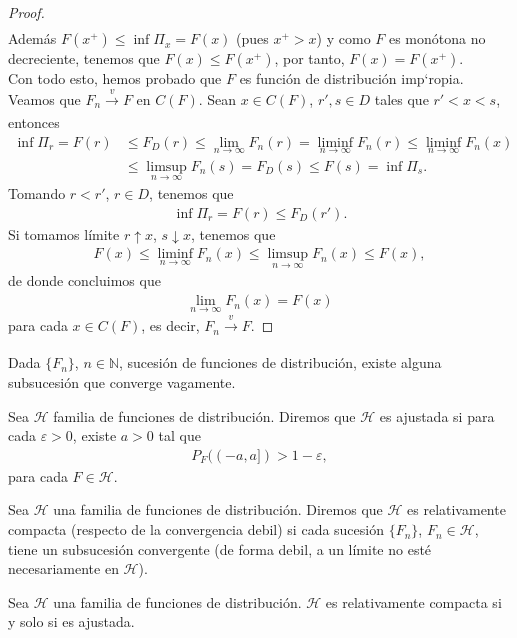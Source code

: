 \begin{proof}
\begin{align*}
    \end{align*}
    Además $F(x^+) \leq \inf \Pi_x = F(x)$ (pues $x^+ > x$) y como $F$ es monótona no decreciente, tenemos que $F(x) \leq F(x^+)$, por tanto, $F(x) = F(x^+)$.
    \\
    \newline
    Con todo esto, hemos probado que $F$ es función de distribución imp`ropia. Veamos que $F_n \xrightarrow[]{v} F$ en $C(F)$. Sean $x \in C(F)$, $r',s \in D$ tales que $r' < x < s$, entonces
    \begin{align*}
       \inf \Pi_r =  F(r) &\leq F_D(r) \leq \lim_{n \to \infty} F_n(r) = \liminf_{n \to \infty} F_n(r) \leq \liminf_{n \to \infty} F_n(x) \\ 
       &\leq \limsup_{n \to \infty} F_n(s) = F_D(s) \leq F(s) = \inf \Pi_s.
    \end{align*}
    Tomando $r < r'$, $r \in D$, tenemos que
    \begin{align*}
        \inf \Pi_r = F(r) \leq F_D(r').
    \end{align*}
    Si tomamos límite $r \uparrow x$, $s \downarrow x$, tenemos que
    \begin{align*}
        F(x) \leq \liminf_{n \to \infty} F_n(x) \leq \limsup_{n \to \infty} F_n(x) \leq F(x),  
    \end{align*}
    de donde concluimos que
    \begin{align*}
        \lim_{n \to \infty} F_n(x) = F(x)
    \end{align*}
    para cada $x \in C(F)$, es decir, $F_n \xrightarrow[]{v} F$.
\end{proof}

\begin{teo}
    Dada $\{F_n\}$, $n \in \mathbb{N}$, sucesión de funciones de distribución, existe alguna subsucesión que converge vagamente.
\end{teo}

\begin{defi}
    Sea $\mathscr{H}$ familia de funciones de distribución. Diremos que $\mathscr{H}$ es ajustada si para cada $\varepsilon > 0$, existe $a > 0$ tal que
    \begin{align*}
        P_F((-a,a]) > 1 - \varepsilon,
    \end{align*}
    para cada $F \in \mathscr{H}$.
\end{defi}

\begin{defi}
    Sea $\mathscr{H}$ una familia de funciones de distribución. Diremos que $\mathscr{H}$ es relativamente compacta (respecto de la convergencia debil) si cada sucesión $\{F_n\}$, $F_n \in \mathscr{H}$, tiene un subsucesión convergente (de forma debil, a un límite no esté necesariamente en $\mathscr{H}$).
\end{defi}

\begin{teo}[Prokhorov]
    Sea $\mathscr{H}$ una familia de funciones de distribución. $\mathscr{H}$ es relativamente compacta si y solo si es ajustada.
\end{teo}